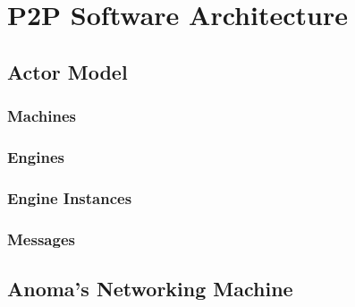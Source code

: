 \section{P2P Software Architecture}

\subsection{Actor Model}

\subsubsection{Machines}

\subsubsection{Engines}

\subsubsection{Engine Instances}

\subsubsection{Messages}

\subsection{Anoma's Networking Machine}

